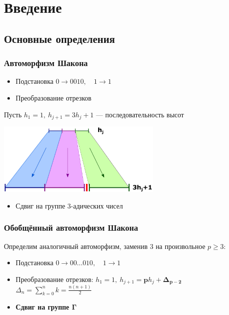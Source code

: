 \section{Введение}


\subsection{Основные определения}

\begin{frame}

    \frametitle{Автоморфизм Шакона}
    \begin{itemize}
    \item Подстановка $0 \to 0010, \quad 1 \to 1$
    \item Преобразование отрезков
    \end{itemize}
    Пусть $h_1 = 1,\ h_{j+1} = 3h_j + 1$ --- последовательность высот
    \begin{center}{\includegraphics[height=35mm]{cutting-and-stacking.pdf}}\end{center}
    \begin{itemize}
    \item Сдвиг на группе $3$-адических чисел
    \end{itemize}
  \begin{flushright}
  
  \end{flushright}
\end{frame}

\begin{frame}
    \frametitle{Обобщённый автоморфизм Шакона}
    Определим аналогичный автоморфизм, заменив $3$ на произвольное $p \ge 3$:
    \begin{itemize}
    \item Подстановка $0 \to 00\ldots010, \quad 1 \to 1$
    \item Преобразование отрезков: $h_1 = 1,\ h_{j+1} = \mathbf{p}h_j + \pmb{\Delta_{p-2}}$\\
    $\Delta_{n} = \sum\limits_{k=0}^n k = \frac{n(n+1)}{2}$
    \item \textbf{Сдвиг на группе $\pmb{\Gamma}$}
    \end{itemize}

\end{frame}

